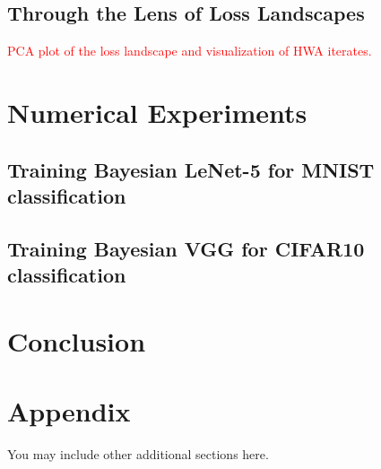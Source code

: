 \documentclass{article} %
\begin{document}
\subsection{Through the Lens of Loss Landscapes}
\textcolor{red}{PCA plot of the loss landscape and visualization of HWA iterates.}


\section{Numerical Experiments}\label{sec:numerical}
\subsection{Training Bayesian LeNet-5 for MNIST classification}


\subsection{Training Bayesian VGG for CIFAR10 classification}


\section{Conclusion}\label{sec:conclusion}

\newpage




\newpage
\appendix
\section{Appendix}
You may include other additional sections here. 
\end{document}
